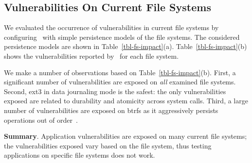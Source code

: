 \subsection{Vulnerabilities On Current File Systems}
\label{sec-currentfs}

 

We evaluated the occurrence of vulnerabilities in current file systems by
configuring \toolname\ with simple persistence models of the file systems. The
considered persistence models are shown in Table~\ref{tbl-fs-impact}(a).
Table~\ref{tbl-fs-impact}(b) shows the vulnerabilities reported by \toolname\
for each file system.

We make a number of observations based on Table~\ref{tbl-fs-impact}(b). First,
a significant number of vulnerabilities are exposed on \textit{all} examined
file systems.  Second, ext3 in data journaling mode is the safest: the only
vulnerabilities exposed are related to durability and atomicity across system
calls. Third, a large number of
vulnerabilities are exposed on btrfs as it aggressively persists operations out
of order~\cite{btrfs-mason}. 


\textbf{Summary}. Application vulnerabilities are exposed on many current file
systems; the vulnerabilities exposed vary based on the file system, thus
testing applications on specific file systems does not work.    




